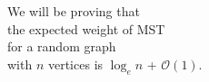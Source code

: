 \documentclass[preview]{standalone}
\begin{document}
\begin{center}
We will be proving that \\the expected weight of MST \\ for a random graph\\ with $n$ vertices is $\log_e n$ + $\mathcal{O}(1)$.
\end{center}
\end{document}
